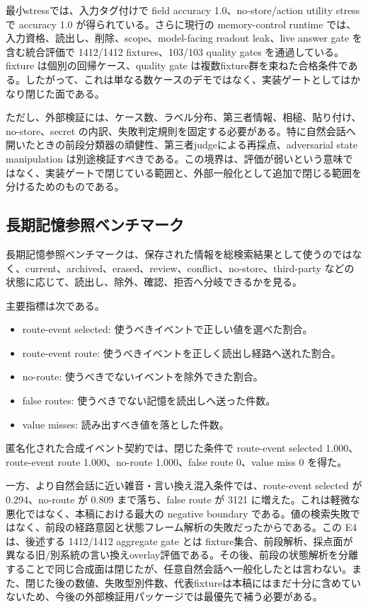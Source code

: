 \documentclass[12pt,a4paper]{article}
\begin{document}
最小stressでは、入力タグ付けで field accuracy 1.0、no-store/action utility stress で accuracy 1.0 が得られている。さらに現行の memory-control runtime では、入力資格、読出し、削除、scope、model-facing readout leak、live answer gate を含む統合評価で 1412/1412 fixtures、103/103 quality gates を通過している。fixture は個別の回帰ケース、quality gate は複数fixture群を束ねた合格条件である。したがって、これは単なる数ケースのデモではなく、実装ゲートとしてはかなり閉じた面である。

ただし、外部検証には、ケース数、ラベル分布、第三者情報、相槌、貼り付け、no-store、secret の内訳、失敗判定規則を固定する必要がある。特に自然会話へ開いたときの前段分類器の頑健性、第三者judgeによる再採点、adversarial state manipulation は別途検証すべきである。この境界は、評価が弱いという意味ではなく、実装ゲートで閉じている範囲と、外部一般化として追加で閉じる範囲を分けるためのものである。

\subsection{長期記憶参照ベンチマーク}\label{ux9577ux671fux8a18ux61b6ux53c2ux7167ux30d9ux30f3ux30c1ux30deux30fcux30af}

長期記憶参照ベンチマークは、保存された情報を総検索結果として使うのではなく、current、archived、erased、review、conflict、no-store、third-party などの状態に応じて、読出し、除外、確認、拒否へ分岐できるかを見る。

主要指標は次である。

\begin{itemize}
\tightlist
\item
  route-event selected: 使うべきイベントで正しい値を選べた割合。
\item
  route-event route: 使うべきイベントを正しく読出し経路へ送れた割合。
\item
  no-route: 使うべきでないイベントを除外できた割合。
\item
  false routes: 使うべきでない記憶を読出しへ送った件数。
\item
  value misses: 読み出すべき値を落とした件数。
\end{itemize}

匿名化された合成イベント契約では、閉じた条件で route-event selected 1.000、route-event route 1.000、no-route 1.000、false route 0、value miss 0 を得た。

一方、より自然会話に近い雑音・言い換え混入条件では、route-event selected が 0.294、no-route が 0.809 まで落ち、false route が 3121 に増えた。これは軽微な悪化ではなく、本稿における最大の negative boundary である。値の検索失敗ではなく、前段の経路意図と状態フレーム解析の失敗だったからである。この E4 は、後述する 1412/1412 aggregate gate とは fixture集合、前段解析、採点面が異なる旧/別系統の言い換えoverlay評価である。その後、前段の状態解析を分離することで同じ合成面は閉じたが、任意自然会話へ一般化したとは言わない。また、閉じた後の数値、失敗型別件数、代表fixtureは本稿にはまだ十分に含めていないため、今後の外部検証用パッケージでは最優先で補う必要がある。
\end{document}

